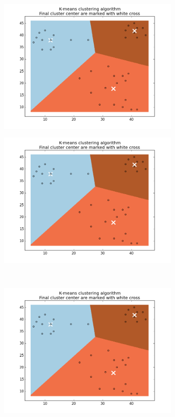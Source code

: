 \documentclass[a4paper,parskip=full-]{article}
\begin{document}
\begin{figure}
\centering
\begin{subfigure}[b]{\linewidth}
\includegraphics[scale=0.5]{3cRND1}
\end{subfigure}
\qquad
\begin{subfigure}[b]{\linewidth}
\includegraphics[scale=0.5]{3cRND2}
\end{subfigure} \\
\begin{subfigure}[b]{\linewidth}
\includegraphics[scale=0.5]{3cRND3}

\end{subfigure}
\end{figure}
\end{document}
